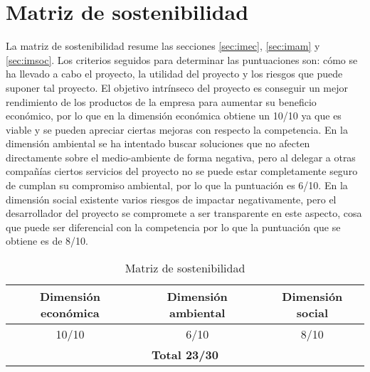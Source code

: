 \section{Matriz de sostenibilidad}
La matriz de sostenibilidad resume las secciones \ref{sec:imec}, \ref{sec:imam} y \ref{sec:imsoc}. Los criterios seguidos para determinar las puntuaciones son: cómo se ha llevado a cabo el proyecto, la utilidad del proyecto y los riesgos que puede suponer tal proyecto.
El objetivo intrínseco del proyecto es conseguir un mejor rendimiento de los productos de la empresa para aumentar su beneficio económico, por lo que en la dimensión económica obtiene un 10/10 ya que es viable y se pueden apreciar ciertas mejoras con respecto la competencia. En la dimensión ambiental se ha intentado buscar soluciones que no afecten directamente sobre el medio-ambiente de forma negativa, pero al delegar a otras compañías ciertos servicios del proyecto no se puede estar completamente seguro de cumplan su compromiso ambiental, por lo que la puntuación es 6/10. En la dimensión social existente varios riesgos de impactar negativamente, pero el desarrollador del proyecto se compromete a ser transparente en este aspecto, cosa que puede ser diferencial con la competencia por lo que la puntuación que se obtiene es de 8/10.

\begin{table}[H]
	\centering
	\begin{tabular}{|c|c|c|}
		\hline
		\textbf{Dimensión económica} & \textbf{Dimensión ambiental} & \textbf{Dimensión social}  \\ \hline
		       10/10                 &        6/10                  &       8/10                 \\ \hline
		\multicolumn{3}{|c|}{\textbf{Total 23/30}} \\ \hline
	\end{tabular} 
	\caption{Matriz de sostenibilidad}
\end{table}
